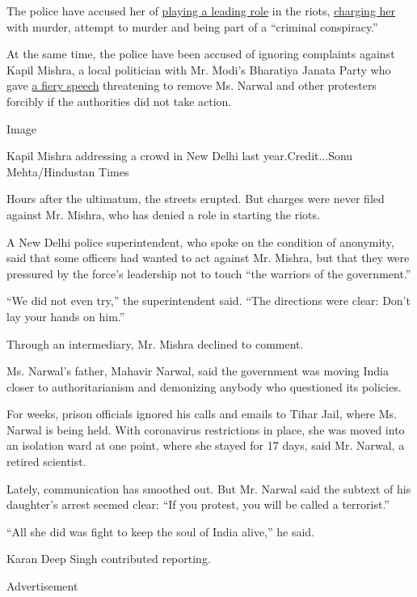 The police have accused her of
\href{https://thewire.in/rights/pinjra-tods-devangana-kalita-natasha-narwal-denied-bail-again-in-delhi-riots-case}{playing
a leading role} in the riots,
\href{https://www.livelaw.in/pdf_upload/pdf_upload-376649.pdf}{charging
her} with murder, attempt to murder and being part of a ``criminal
conspiracy.''

At the same time, the police have been accused of ignoring complaints
against Kapil Mishra, a local politician with Mr. Modi's Bharatiya
Janata Party who gave
\href{https://www.nytimes.com/2020/02/26/world/asia/delhi-riots-kapil-mishra.html}{a
fiery speech} threatening to remove Ms. Narwal and other protesters
forcibly if the authorities did not take action.

Image

Kapil Mishra addressing a crowd in New Delhi last year.Credit...Sonu
Mehta/Hindustan Times

Hours after the ultimatum, the streets erupted. But charges were never
filed against Mr. Mishra, who has denied a role in starting the riots.

A New Delhi police superintendent, who spoke on the condition of
anonymity, said that some officers had wanted to act against Mr. Mishra,
but that they were pressured by the force's leadership not to touch
``the warriors of the government.''

``We did not even try,'' the superintendent said. ``The directions were
clear: Don't lay your hands on him.''

Through an intermediary, Mr. Mishra declined to comment.

Ms. Narwal's father, Mahavir Narwal, said the government was moving
India closer to authoritarianism and demonizing anybody who questioned
its policies.

For weeks, prison officials ignored his calls and emails to Tihar Jail,
where Ms. Narwal is being held. With coronavirus restrictions in place,
she was moved into an isolation ward at one point, where she stayed for
17 days, said Mr. Narwal, a retired scientist.

Lately, communication has smoothed out. But Mr. Narwal said the subtext
of his daughter's arrest seemed clear: ``If you protest, you will be
called a terrorist.''

``All she did was fight to keep the soul of India alive,'' he said.

Karan Deep Singh contributed reporting.

Advertisement

